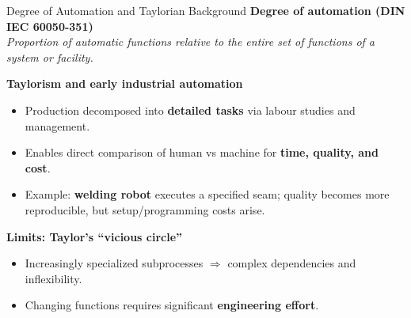 \begin{frame}{Degree of Automation and Taylorian Background}
\textbf{Degree of automation (DIN IEC 60050-351)}\\
\emph{Proportion of automatic functions relative to the entire set of functions of a system or facility.}

\vspace{2mm}
\textbf{Taylorism and early industrial automation}
\begin{itemize}
  \item Production decomposed into \textbf{detailed tasks} via labour studies and management.
  \item Enables direct comparison of human vs machine for \textbf{time, quality, and cost}.
  \item Example: \textbf{welding robot} executes a specified seam; quality becomes more reproducible, but setup/programming costs arise.
\end{itemize}

\vspace{1mm}
\textbf{Limits: Taylor's ``vicious circle''}
\begin{itemize}
  \item Increasingly specialized subprocesses $\Rightarrow$ complex dependencies and inflexibility.
  \item Changing functions requires significant \textbf{engineering effort}.
\end{itemize}
\end{frame}

